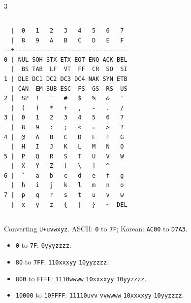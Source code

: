 \documentclass[landscape, 8pt, a4paper, oneside]{extarticle}
\begin{document}
\begin{multicols*}{3}
\subsection{}
\begin{verbatim}
  |  0   1   2   3   4   5   6   7 
  |  8   9   A   B   C   D   E   F 
--+--------------------------------
0 | NUL SOH STX ETX EOT ENQ ACK BEL
  |  BS TAB  LF  VT  FF  CR  SO  SI
1 | DLE DC1 DC2 DC3 DC4 NAK SYN ETB
  | CAN  EM SUB ESC  FS  GS  RS  US
2 |  SP  !   "   #   $   %   &   ' 
  |  (   )   *   +   ,   -   .   / 
3 |  0   1   2   3   4   5   6   7 
  |  8   9   :   ;   <   =   >   ? 
4 |  @   A   B   C   D   E   F   G 
  |  H   I   J   K   L   M   N   O 
5 |  P   Q   R   S   T   U   V   W 
  |  X   Y   Z   [   \   ]   ^   _ 
6 |  `   a   b   c   d   e   f   g 
  |  h   i   j   k   l   m   n   o 
7 |  p   q   r   s   t   u   v   w 
  |  x   y   z   {   |   }   ~  DEL
\end{verbatim}
\subsection{}
Converting \texttt{U+uvwxyz}. ASCII: \texttt{0} to \texttt{7F}; Korean: \texttt{AC00} to \texttt{D7A3}.
\begin{itemize}
	\item \texttt{0} to \texttt{7F}: \texttt{0yyyzzzz}.
	\item \texttt{80} to \texttt{7FF}: \texttt{110xxxyy} \texttt{10yyzzzz}.
	\item \texttt{800} to \texttt{FFFF}: \texttt{1110wwww} \texttt{10xxxxyy} \texttt{10yyzzzz}.
	\item \texttt{10000} to \texttt{10FFFF}: \texttt{11110uvv} \texttt{vvwwww} \texttt{10xxxxyy} \texttt{10yyzzzz}.
\end{itemize}

\end{multicols*} 
\end{document}
